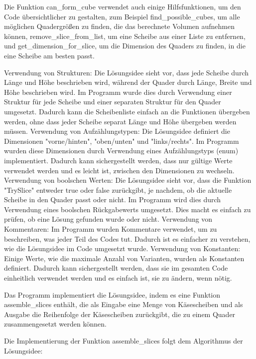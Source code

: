 \documentclass[a4paper,10pt,ngerman]{scrartcl}
\begin{document}
    Die Funktion can_form_cube verwendet auch einige Hilfsfunktionen, um den Code übersichtlicher zu gestalten,
    zum Beispiel find_possible_cubes, um alle möglichen Quadergrößen zu finden, die das berechnete Volumen aufnehmen können, remove_slice_from_list, um eine Scheibe aus einer Liste zu entfernen, und get_dimension_for_slice, um die Dimension des Quaders zu finden, in die eine Scheibe am besten passt.

    Verwendung von Strukturen: Die Lösungsidee sieht vor, dass jede Scheibe durch Länge und Höhe beschrieben wird, während der Quader durch Länge, Breite und Höhe beschrieben wird.
    Im Programm wurde dies durch Verwendung einer Struktur für jede Scheibe und einer separaten Struktur für den Quader umgesetzt.
    Dadurch kann die Scheibenliste einfach an die Funktionen übergeben werden, ohne dass jeder Scheibe separat Länge und Höhe übergeben werden müssen.
    Verwendung von Aufzählungstypen: Die Lösungsidee definiert die Dimensionen "vorne/hinten", "oben/unten" und "links/rechts".
    Im Programm wurden diese Dimensionen durch Verwendung eines Aufzählungstyps (enum) implementiert.
    Dadurch kann sichergestellt werden, dass nur gültige Werte verwendet werden und es leicht ist, zwischen den Dimensionen zu wechseln.
    Verwendung von boolschen Werten: Die Lösungsidee sieht vor, dass die Funktion "TrySlice" entweder true oder false zurückgibt, je nachdem, ob die aktuelle Scheibe in den Quader passt oder nicht.
    Im Programm wird dies durch Verwendung eines boolschen Rückgabewerts umgesetzt.
    Dies macht es einfach zu prüfen, ob eine Lösung gefunden wurde oder nicht.
    Verwendung von Kommentaren: Im Programm wurden Kommentare verwendet, um zu beschreiben, was jeder Teil des Codes tut.
    Dadurch ist es einfacher zu verstehen, wie die Lösungsidee im Code umgesetzt wurde.
    Verwendung von Konstanten: Einige Werte, wie die maximale Anzahl von Varianten, wurden als Konstanten definiert.
    Dadurch kann sichergestellt werden, dass sie im gesamten Code einheitlich verwendet werden und es einfach ist, sie zu ändern, wenn nötig.

    Das Programm implementiert die Lösungsidee, indem es eine Funktion assemble_slices enthält, die als Eingabe eine Menge von Käsescheiben und als Ausgabe die Reihenfolge der Käsescheiben zurückgibt, die zu einem Quader zusammengesetzt werden können.

    Die Implementierung der Funktion assemble_slices folgt dem Algorithmus der Lösungsidee:
\end{document}
